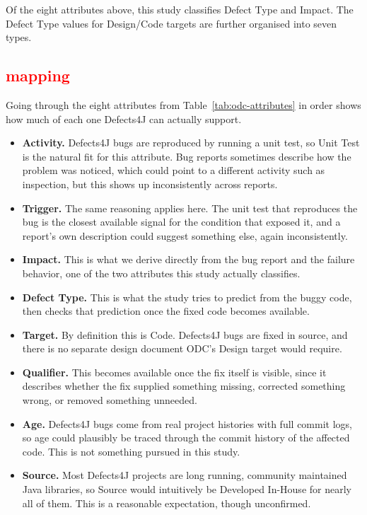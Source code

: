 Of the eight attributes above, this study classifies Defect Type and Impact.
The Defect Type values for Design/Code targets are further organised into
seven types.

\subsection{\textcolor{red}{mapping}}
Going through the eight attributes from Table~\ref{tab:odc-attributes} in
order shows how much of each one Defects4J can actually support.

\begin{itemize}
\item \textbf{Activity.} Defects4J bugs are reproduced by running a unit
  test, so Unit Test is the natural fit for this attribute. Bug reports
  sometimes describe how the problem was noticed, which could point to a
  different activity such as inspection, but this shows up inconsistently
  across reports.
\item \textbf{Trigger.} The same reasoning applies here. The unit test that
  reproduces the bug is the closest available signal for the condition that
  exposed it, and a report's own description could suggest something else,
  again inconsistently.
\item \textbf{Impact.} This is what we derive directly from the bug report
  and the failure behavior, one of the two attributes this study actually
  classifies.
\item \textbf{Defect Type.} This is what the study tries to predict from the
  buggy code, then checks that prediction once the fixed code becomes
  available.
\item \textbf{Target.} By definition this is Code. Defects4J bugs are fixed
  in source, and there is no separate design document ODC's Design target
  would require.
\item \textbf{Qualifier.} This becomes available once the fix itself is
  visible, since it describes whether the fix supplied something missing,
  corrected something wrong, or removed something unneeded.
\item \textbf{Age.} Defects4J bugs come from real project histories with
  full commit logs, so age could plausibly be traced through the commit
  history of the affected code. This is not something pursued in this
  study.
\item \textbf{Source.} Most Defects4J projects are long running, community
  maintained Java libraries, so Source would intuitively be Developed
  In-House for nearly all of them. This is a reasonable expectation, though
  unconfirmed.
\end{itemize}

